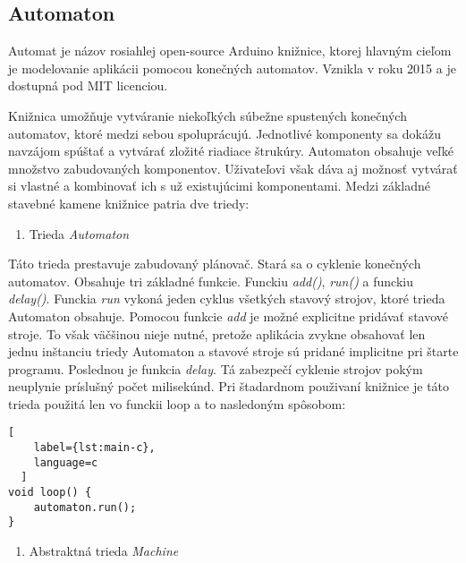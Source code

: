 
\subsection{Automaton}
\noindent Automat je názov rosiahlej open-source Arduino knižnice, ktorej hlavným cieľom
je modelovanie aplikácii pomocou konečných automatov. Vznikla v roku 2015 a je dostupná pod MIT licenciou.
\par Knižnica umožňuje vytváranie niekoľkých súbežne spustených konečných automatov, ktoré medzi sebou spoluprácujú. Jednotlivé komponenty sa dokážu navzájom spúštať a vytvárať zložité riadiace štrukúry. Automaton obsahuje veľké množstvo zabudovaných komponentov. Uživateľovi však dáva aj možnosť vytvárať si vlastné a kombinovať ich s už existujúcimi komponentami. Medzi základné stavebné kamene knižnice patria dve triedy: 
\begin{enumerate}
    \item Trieda \textit{Automaton}
\end{enumerate}

\noindent \par Táto trieda prestavuje zabudovaný plánovač. Stará sa o cyklenie konečných automatov. Obsahuje tri základné funkcie. Funckiu \textit{add()}, \textit{run()} a funckiu \textit{delay()}. Funckia \textit{run} vykoná jeden cyklus všetkých stavový strojov, ktoré trieda Automaton obsahuje. Pomocou funkcie \textit{add} je možné explicitne pridávať stavové stroje. To však väčšinou nieje nutné, pretože aplikácia zvykne obsahovať len jednu inštanciu triedy Automaton a stavové stroje sú pridané implicitne pri štarte programu. Poslednou je funkcia \textit{delay}. Tá zabezpečí cyklenie strojov pokým neuplynie príslušný počet milisekúnd.  Pri štadardnom použivaní knižnice je táto trieda použitá len vo funckii loop a to nasledoným spôsobom:

\begin{lstlisting}[
    label={lst:main-c},
    language=c
  ]
void loop() {
    automaton.run();
}

\end{lstlisting}

\begin{enumerate}[resume]
    \item Abstraktná trieda \textit{Machine}
\end{enumerate}

